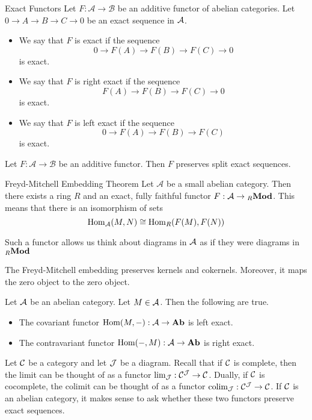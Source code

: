 \documentclass[a4paper]{article}
\begin{document}
\begin{defn}{Exact Functors}{} Let $F:\mathcal{A}\to\mathcal{B}$ be an additive functor of abelian categories. Let $0\to A\to B\to C\to 0$ be an exact sequence in $\mathcal{A}$. 
\begin{itemize}
\item We say that $F$ is exact if the sequence $$0\to F(A)\to F(B)\to F(C)\to 0$$ is exact. 
\item We say that $F$ is right exact if the sequence $$F(A)\to F(B)\to F(C)\to 0$$ is exact. 
\item We say that $F$ is left exact if the sequence $$0\to F(A)\to F(B)\to F(C)$$ is exact. 
\end{itemize}
\end{defn}

\begin{prp}{}{} Let $F:\mathcal{A}\to\mathcal{B}$ be an additive functor. Then $F$ preserves split exact sequences. 
\end{prp}

\begin{thm}{Freyd-Mitchell Embedding Theorem}{} Let $\mathcal{A}$ be a small abelian category. Then there exists a ring $R$ and an exact, fully faithful functor $F:\mathcal{A}\to{_R\bold{Mod}}$. This means that there is an isomorphism of sets $$\operatorname{Hom}_{\mathcal{A}}(M,N)\cong\operatorname{Hom}_R(F(M),F(N))$$ 
\end{thm}

Such a functor allows us think about diagrams in $\mathcal{A}$ as if they were diagrams in ${_R\bold{Mod}}$

\begin{lmm}{}{} The Freyd-Mitchell embedding preserves kernels and cokernels. Moreover, it maps the zero object to the zero object. 
\end{lmm}

\begin{thm}{}{} Let $\mathcal{A}$ be an abelian category. Let $M\in\mathcal{A}$. Then the following are true. 
\begin{itemize}
\item The covariant functor $\operatorname{Hom}(M,-):\mathcal{A}\to\bold{Ab}$ is left exact. 
\item The contravariant functor $\operatorname{Hom}(-,M):\mathcal{A}\to\bold{Ab}$ is right exact. 
\end{itemize}
\end{thm}

Let $\mathcal{C}$ be a category and let $\mathcal{J}$ be a diagram. Recall that if $\mathcal{C}$ is complete, then the limit can be thought of as a functor $\lim_{\mathcal{J}}:\mathcal{C}^{\mathcal{J}}\to\mathcal{C}$. Dually, if $\mathcal{C}$ is cocomplete, the colimit can be thought of as a functor $\operatorname*{colim}_{\mathcal{J}}:\mathcal{C}^{\mathcal{J}}\to\mathcal{C}$. If $\mathcal{C}$ is an abelian category, it makes sense to ask whether these two functors preserve exact sequences. 
\end{document}
